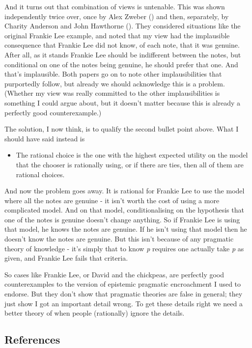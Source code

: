 \documentclass[
  10pt,
  letterpaper,
  DIV=11,
  numbers=noendperiod,
  twoside]{scrartcl}
\providecommand{\tightlist}{%
  \setlength{\itemsep}{0pt}\setlength{\parskip}{0pt}}\usepackage{longtable,booktabs,array}
\begin{document}
And it turns out that combination of views is untenable. This was shown
independently twice over, once by Alex Zweber
() and then, separately, by Charity
Anderson and John Hawthorne
(). They considered
situations like the original Frankie Lee example, and noted that my view
had the implausible consequence that Frankie Lee did not know, of each
note, that it was genuine. After all, as it stands Frankie Lee should be
indifferent between the notes, but conditional on one of the notes being
genuine, he should prefer that one. And that's implausible. Both papers
go on to note other implausibilities that purportedly follow, but
already we should acknowledge this is a problem. (Whether my view was
really committed to the other implausibilities is something I could
argue about, but it doesn't matter because this is already a perfectly
good counterexample.)

The solution, I now think, is to qualify the second bullet point above.
What I should have said instead is

\begin{itemize}
\tightlist
\item
  The rational choice is the one with the highest expected utility on
  the model that the chooser is rationally using, or if there are ties,
  then all of them are rational choices.
\end{itemize}

And now the problem goes away. It is rational for Frankie Lee to use the
model where all the notes are genuine - it isn't worth the cost of using
a more complicated model. And on that model, conditionalising on the
hypothesis that one of the notes is genuine doesn't change anything. So
if Frankie Lee is using that model, he knows the notes are genuine. If
he isn't using that model then he doesn't know the notes are genuine.
But this isn't because of any pragmatic theory of knowledge - it's
simply that to know \emph{p} requires one actually take \emph{p} as
given, and Frankie Lee fails that criteria.

So cases like Frankie Lee, or David and the chickpeas, are perfectly
good counterexamples to the version of epistemic pragmatic encroachment
I used to endorse. But they don't show that pragmatic theories are false
in general; they just show I got an important detail wrong. To get these
details right we need a better theory of when people (rationally) ignore
the details.

\subsection*{References}\label{references}
\end{document}
